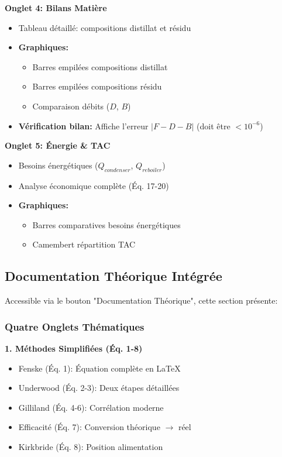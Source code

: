 \documentclass[11pt,a4paper]{article}
\begin{document}
\textbf{Onglet 4: Bilans Matière}

\begin{itemize}[leftmargin=*]
    \item Tableau détaillé: compositions distillat et résidu
    \item \textbf{Graphiques:}
    \begin{itemize}
        \item Barres empilées compositions distillat
        \item Barres empilées compositions résidu
        \item Comparaison débits ($D$, $B$)
    \end{itemize}
    \item \textbf{Vérification bilan:} Affiche l'erreur $|F - D - B|$ (doit être $< 10^{-6}$)
\end{itemize}

\textbf{Onglet 5: Énergie \& TAC}

\begin{itemize}[leftmargin=*]
    \item Besoins énergétiques ($Q_{condenser}$, $Q_{reboiler}$)
    \item Analyse économique complète (Éq. 17-20)
    \item \textbf{Graphiques:}
    \begin{itemize}
        \item Barres comparatives besoins énergétiques
        \item Camembert répartition TAC
    \end{itemize}
\end{itemize}

\subsection{Documentation Théorique Intégrée}

Accessible via le bouton "Documentation Théorique", cette section présente:

\subsubsection{Quatre Onglets Thématiques}

\textbf{1. Méthodes Simplifiées (Éq. 1-8)}

\begin{itemize}[leftmargin=*]
    \item Fenske (Éq. 1): Équation complète en LaTeX
    \item Underwood (Éq. 2-3): Deux étapes détaillées
    \item Gilliland (Éq. 4-6): Corrélation moderne
    \item Efficacité (Éq. 7): Conversion théorique $\rightarrow$ réel
    \item Kirkbride (Éq. 8): Position alimentation
\end{itemize}
\end{document}
